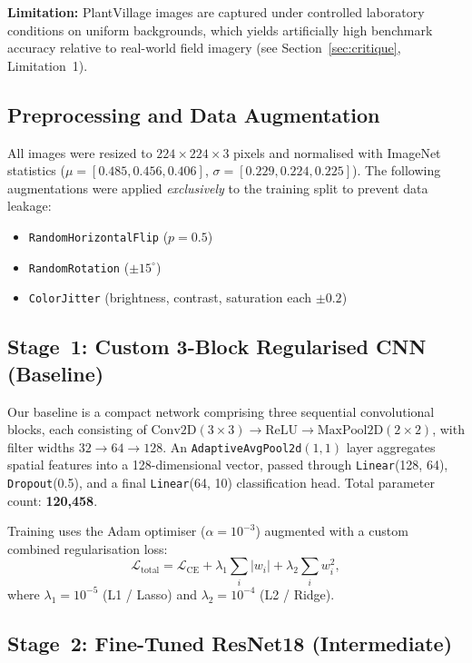 \documentclass[journal]{IEEEtran}
\begin{document}
\textbf{Limitation:} PlantVillage images are captured under
controlled laboratory conditions on uniform backgrounds, which
yields artificially high benchmark accuracy relative to real-world
field imagery (see Section~\ref{sec:critique}, Limitation~1).

\subsection{Preprocessing and Data Augmentation}

All images were resized to $224 \times 224 \times 3$ pixels
and normalised with ImageNet statistics
($\mu = [0.485, 0.456, 0.406]$,
$\sigma = [0.229, 0.224, 0.225]$).
The following augmentations were applied \emph{exclusively} to
the training split to prevent data leakage:
\begin{itemize}
  \item \texttt{RandomHorizontalFlip} ($p=0.5$)
  \item \texttt{RandomRotation} ($\pm 15^{\circ}$)
  \item \texttt{ColorJitter} (brightness, contrast, saturation
        each $\pm 0.2$)
\end{itemize}

\subsection{Stage~1: Custom 3-Block Regularised CNN (Baseline)}

Our baseline is a compact network comprising three sequential
convolutional blocks, each consisting of
$\text{Conv2D}(3{\times}3) \to \text{ReLU} \to
\text{MaxPool2D}(2{\times}2)$, with filter widths
$32 \to 64 \to 128$.
An \texttt{AdaptiveAvgPool2d}$(1,1)$ layer aggregates spatial
features into a 128-dimensional vector, passed through
\texttt{Linear}(128, 64), \texttt{Dropout}(0.5), and a final
\texttt{Linear}(64, 10) classification head.
Total parameter count: \textbf{120,458}.

Training uses the Adam optimiser ($\alpha=10^{-3}$) augmented
with a custom combined regularisation loss:
\begin{equation}
  \mathcal{L}_{\text{total}} = \mathcal{L}_{\text{CE}}
  + \lambda_{1}\sum_{i}|w_i|
  + \lambda_{2}\sum_{i}w_i^2,
  \label{eq:reg_loss}
\end{equation}
where $\lambda_1 = 10^{-5}$ (L1 / Lasso) and
$\lambda_2 = 10^{-4}$ (L2 / Ridge).

\subsection{Stage~2: Fine-Tuned ResNet18 (Intermediate)}
\end{document}
